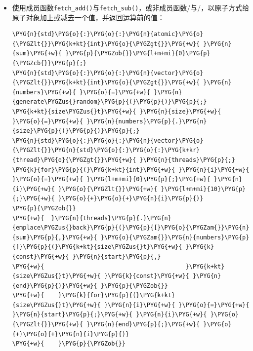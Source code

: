\begin{itemize}

\item 使用成员函数\texttt{fetch\_\allowbreak{}add()}与\texttt{fetch\_\allowbreak{}sub()}，或非成员函数/与/，以原子方式给原子对象加上或减去一个值，并返回运算前的值：



\begin{codeblockbg}
\begin{Verbatim}[commandchars=\\\{\},breaklines=true,breakanywhere=true,fontsize=\codefont,xleftmargin=17bp]
\PYG{n}{std}\PYG{o}{:}\PYG{o}{:}\PYG{n}{atomic}\PYG{o}{\PYGZlt{}}\PYG{k+kt}{int}\PYG{o}{\PYGZgt{}}\PYG{+w}{ }\PYG{n}{sum}\PYG{+w}{ }\PYG{p}{\PYGZob{}}\PYG{l+m+mi}{0}\PYG{p}{\PYGZcb{}}\PYG{p}{;}
\PYG{n}{std}\PYG{o}{:}\PYG{o}{:}\PYG{n}{vector}\PYG{o}{\PYGZlt{}}\PYG{k+kt}{int}\PYG{o}{\PYGZgt{}}\PYG{+w}{ }\PYG{n}{numbers}\PYG{+w}{ }\PYG{o}{=}\PYG{+w}{ }\PYG{n}{generate\PYGZus{}random}\PYG{p}{(}\PYG{p}{)}\PYG{p}{;}
\PYG{k+kt}{size\PYGZus{}t}\PYG{+w}{ }\PYG{n}{size}\PYG{+w}{ }\PYG{o}{=}\PYG{+w}{ }\PYG{n}{numbers}\PYG{p}{.}\PYG{n}{size}\PYG{p}{(}\PYG{p}{)}\PYG{p}{;}
\PYG{n}{std}\PYG{o}{:}\PYG{o}{:}\PYG{n}{vector}\PYG{o}{\PYGZlt{}}\PYG{n}{std}\PYG{o}{:}\PYG{o}{:}\PYG{k+kr}{thread}\PYG{o}{\PYGZgt{}}\PYG{+w}{ }\PYG{n}{threads}\PYG{p}{;}
\PYG{k}{for}\PYG{p}{(}\PYG{k+kt}{int}\PYG{+w}{ }\PYG{n}{i}\PYG{+w}{ }\PYG{o}{=}\PYG{+w}{ }\PYG{l+m+mi}{0}\PYG{p}{;}\PYG{+w}{ }\PYG{n}{i}\PYG{+w}{ }\PYG{o}{\PYGZlt{}}\PYG{+w}{ }\PYG{l+m+mi}{10}\PYG{p}{;}\PYG{+w}{ }\PYG{o}{+}\PYG{o}{+}\PYG{n}{i}\PYG{p}{)}
\PYG{p}{\PYGZob{}}
\PYG{+w}{  }\PYG{n}{threads}\PYG{p}{.}\PYG{n}{emplace\PYGZus{}back}\PYG{p}{(}\PYG{p}{[}\PYG{o}{\PYGZam{}}\PYG{n}{sum}\PYG{p}{,}\PYG{+w}{ }\PYG{o}{\PYGZam{}}\PYG{n}{numbers}\PYG{p}{]}\PYG{p}{(}\PYG{k+kt}{size\PYGZus{}t}\PYG{+w}{ }\PYG{k}{const}\PYG{+w}{ }\PYG{n}{start}\PYG{p}{,}
\PYG{+w}{                                        }\PYG{k+kt}{size\PYGZus{}t}\PYG{+w}{ }\PYG{k}{const}\PYG{+w}{ }\PYG{n}{end}\PYG{p}{)}\PYG{+w}{ }\PYG{p}{\PYGZob{}}
\PYG{+w}{    }\PYG{k}{for}\PYG{p}{(}\PYG{k+kt}{size\PYGZus{}t}\PYG{+w}{ }\PYG{n}{i}\PYG{+w}{ }\PYG{o}{=}\PYG{+w}{ }\PYG{n}{start}\PYG{p}{;}\PYG{+w}{ }\PYG{n}{i}\PYG{+w}{ }\PYG{o}{\PYGZlt{}}\PYG{+w}{ }\PYG{n}{end}\PYG{p}{;}\PYG{+w}{ }\PYG{o}{+}\PYG{o}{+}\PYG{n}{i}\PYG{p}{)}
\PYG{+w}{    }\PYG{p}{\PYGZob{}}

\end{Verbatim}
\end{codeblockbg}
\end{itemize}
